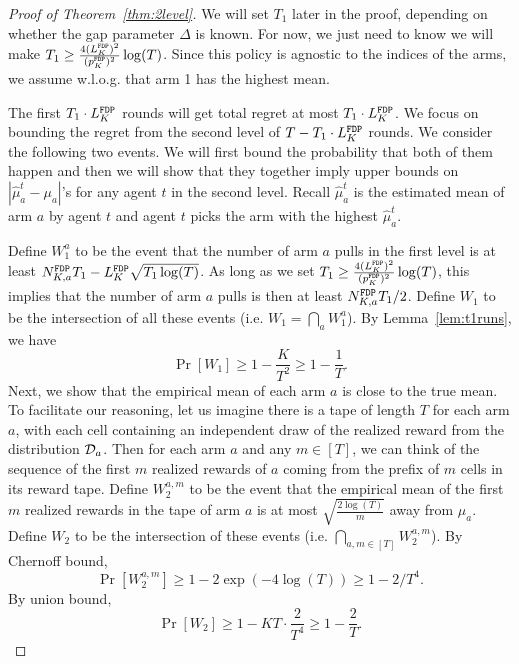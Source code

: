 \begin{proof}[Proof of Theorem~\ref{thm:2level}]
  We will set $T_1$ later in the proof, depending on whether the gap
  parameter $\Delta$ is known. For now, we just need to know we will
  make $T_1 \geq \frac{4(L^\mathtt{FDP}_K)^2}{(p^\mathtt{FDP}_K)^2}\log(T)$. Since this policy is
  agnostic to the indices of the arms, we assume w.l.o.g. that arm 1
  has the highest mean.

  The first $T_1 \cdot L^\mathtt{FDP}_K$ rounds will get total regret at most
  $T_1 \cdot L^\mathtt{FDP}_K$.  We focus on bounding the regret from the second
  level of $T - T_1 \cdot L^\mathtt{FDP}_K$ rounds. We consider the following two
   events. We will first bound the probability that both of them
  happen and then we will show that they together imply upper bounds
  on $|\hat{\mu}^t_a - \mu_a|$'s for any agent $t$ in the second
  level. Recall $\hat{\mu}^t_a$ is the estimated mean of arm $a$ by
  agent $t$ and agent $t$ picks the arm with the highest
  $\hat{\mu}^t_a$.

  Define $W_1^a$ to be the event that the number of arm $a$ pulls in
  the first level is at least $N^\mathtt{FDP}_{K,a} T_1- L^\mathtt{FDP}_K \sqrt{T_1\log(T)}$.
  As long as we set $T_1 \geq \frac{4(L^\mathtt{FDP}_K)^2}{(p^\mathtt{FDP}_K)^2}\log(T)$,
    this implies that the number of arm $a$ pulls is then at least
    $N^\mathtt{FDP}_{K,a} T_1/2$.
Define $W_1$ to be the intersection of all these events (i.e. $W_1 = \bigcap_{a}W_1^a$). By Lemma~\ref{lem:t1runs}, we have
\[
\Pr[W_1] \geq 1- \frac{K}{T^2} \geq 1 - \frac{1}{T}.
\]
  Next, we show that the empirical mean of
each arm $a$ is close to the true mean. To facilitate our reasoning,
let us imagine there is a tape of length $T$ for each arm $a$, with
each cell containing an independent draw of the realized reward from
the distribution $\mathcal{D}_a$. Then for each arm $a$ and any $m\in [T]$, we
can think of the sequence of the first $m$ realized rewards of $a$
coming from the prefix of $m$ cells in its reward tape. Define
$W^{a,m}_2$ to be the event that the empirical mean of the first $m$
realized rewards in the tape of arm $a$ is at most
$\sqrt{\frac{2\log(T)}{m}}$ away from $\mu_a$. Define $W_2$ to be the
intersection of these events (i.e.  $\bigcap_{a,m\in[T]} W^{a,m}_2$).  By
Chernoff bound,%
\[
\Pr[W^{a,m}_2] \geq 1 - 2\exp(-4\log(T)) \geq 1-2/T^4.
\]
By union bound,
\[
\Pr[W_2] \geq 1 - KT \cdot \frac{2}{T^4} \geq 1 - \frac{2}{T}.
\]




\end{proof}
